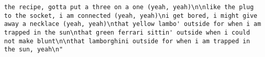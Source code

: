 \documentclass[]{article}
\begin{document}
\begin{verbatim}
the recipe, gotta put a three on a one (yeah, yeah)\n\nlike the plug to the socket, i am connected (yeah, yeah)\ni get bored, i might give away a necklace (yeah, yeah)\nthat yellow lambo' outside for when i am trapped in the sun\nthat green ferrari sittin' outside when i could not make blunt\n\nthat lamborghini outside for when i am trapped in the sun, yeah\n"                                                                                                                                                                                                                                                                                                                                                                                                                                                                                                                                                                                                                                                                                                                                                                                                                                                                                                                                                                                                                                                                                                                                                                                                                                                                                                                                                                                                                                                                                                                                                                                                                                                                                                                                                                                                                                                                                                                                                                                                                                                                                                                                                                                                                                                                                                                                                                                                                                                                                                                                                                                                                      

\end{verbatim}
\end{document}
